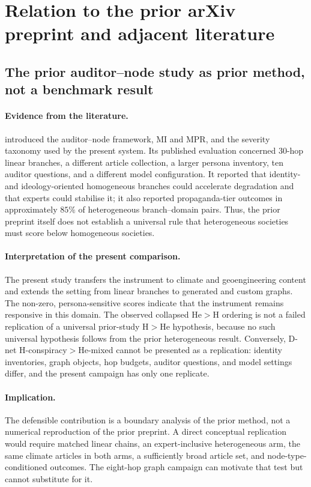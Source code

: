\section{Relation to the prior arXiv preprint and adjacent literature}
\label{sec:discussion-literature}

\subsection{The prior auditor--node study as prior method, not a benchmark result}

\paragraph{Evidence from the literature.}
\textcite{maurya2025simulating} introduced the auditor--node framework, MI and
MPR, and the severity taxonomy used by the present system.  Its published
evaluation concerned 30-hop linear branches, a different article collection,
a larger persona inventory, ten auditor questions, and a different model
configuration.  It reported that identity- and ideology-oriented homogeneous
branches could accelerate degradation and that experts could stabilise it;
it also reported propaganda-tier outcomes in approximately $85\%$ of
heterogeneous branch--domain pairs.  Thus, the prior preprint itself does not
establish a universal rule that heterogeneous societies must score below
homogeneous societies.

\paragraph{Interpretation of the present comparison.}
The present study transfers the instrument to climate and geoengineering
content and extends the setting from linear branches to generated and custom
graphs.  The non-zero, persona-sensitive scores indicate that the instrument
remains responsive in this domain.  The observed collapsed He$>$H ordering is
not a failed replication of a universal prior-study H$>$He hypothesis, because no
such universal hypothesis follows from the prior heterogeneous result.
Conversely, D-net H-conspiracy$>$He-mixed cannot be presented as a
replication: identity inventories, graph objects, hop budgets, auditor
questions, and model settings differ, and the present campaign has only one
replicate.

\paragraph{Implication.}
The defensible contribution is a boundary analysis of the prior method, not a
numerical reproduction of the prior preprint.  A direct conceptual replication
would require matched linear chains, an expert-inclusive heterogeneous arm,
the same climate articles in both arms, a sufficiently broad article set, and
node-type-conditioned outcomes.  The eight-hop graph campaign can motivate
that test but cannot substitute for it.

